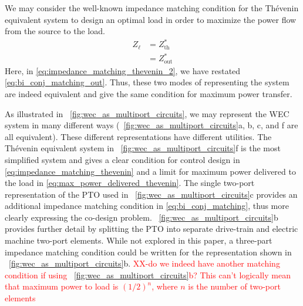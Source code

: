 \documentclass[lettersize,journal]{IEEEtran}
\newcommand{\rc}[1]{\textcolor{red}{#1}}
\begin{document}
We may consider the well-known impedance matching condition for the Th\'{e}venin equivalent system to design an optimal load in order to maximize the power flow from the source to the load.
\begin{subequations}
\begin{align}
        Z_\ell &= Z_{\textrm{th}}^* \\
        &= Z_{\textrm{out}}^* \label{eq:impedance_matching_thevenin_2}
\end{align} \label{eq:impedance_matching_thevenin}
\end{subequations}
\noindent{}Here, in \eqref{eq:impedance_matching_thevenin_2}, we have restated \eqref{eq:bi_conj_matching_out}.
Thus, these two modes of representing the system are indeed equivalent and give the same condition for maximum power transfer.

As illustrated in \figurename~\ref{fig:wec_as_multiport_circuits}, we may represent the WEC system in many different ways (\figurename~\ref{fig:wec_as_multiport_circuits}a, b, c, and f are all equivalent).
These different representations have different utilities.
The Th\'{e}venin equivalent system in \figurename~\ref{fig:wec_as_multiport_circuits}f is the most simplified system and gives a clear condition for control design in \eqref{eq:impedance_matching_thevenin} and a limit for maximum power delivered to the load in \eqref{eq:max_power_delivered_thevenin}.
The single two-port representation of the PTO used in \figurename~\ref{fig:wec_as_multiport_circuits}c provides an additional impedance matching condition in \eqref{eq:bi_conj_matching}, thus more clearly expressing the co-design problem.
\figurename~\ref{fig:wec_as_multiport_circuits}b provides further detail by splitting the PTO into separate drive-train and electric machine two-port elements.
While not explored in this paper, a three-part impedance matching condition could be written for the representation shown in \figurename~\ref{fig:wec_as_multiport_circuits}b.
\rc{XX-do we indeed have another matching condition if using \figurename~\ref{fig:wec_as_multiport_circuits}b? This can't logically mean that maximum power to load is $(1/2)^n$, where $n$ is the number of two-port elements}


\end{document}

